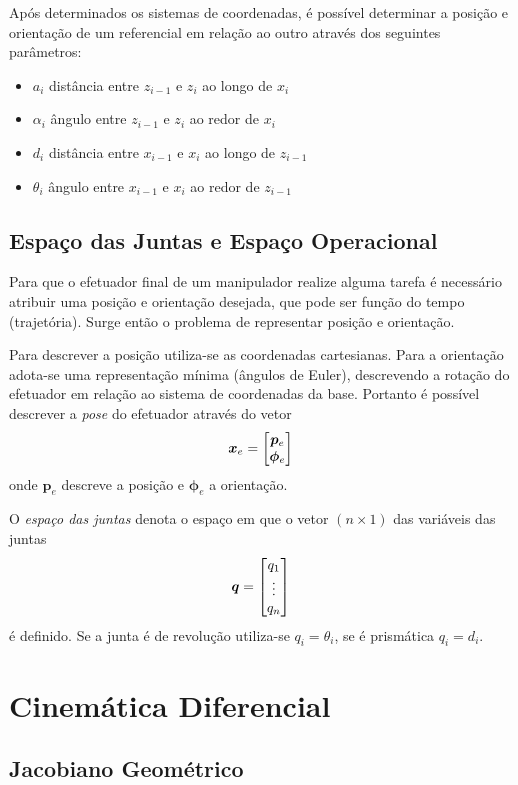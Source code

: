 Após determinados os sistemas de coordenadas, é possível determinar a posição e orientação de um referencial em relação ao outro através dos seguintes parâmetros:
\begin{itemize}
\item $a_i$ distância entre $z_{i-1}$ e $z_i$ ao longo de $x_i$
\item $\alpha_i$ ângulo entre $z_{i-1}$ e $z_i$ ao redor de $x_i$
\item $d_i$ distância entre $x_{i-1}$ e $x_i$ ao longo de $z_{i-1}$
\item $\theta_i$ ângulo entre $x_{i-1}$ e $x_i$ ao redor de $z_{i-1}$
\end{itemize}
\subsection{Espaço das Juntas e Espaço Operacional}
Para que o efetuador final de um manipulador realize alguma tarefa é necessário atribuir uma posição e orientação desejada, que  pode ser função do tempo (trajetória). Surge então o problema de representar posição e orientação. 

Para descrever a posição utiliza-se as coordenadas cartesianas. Para a orientação adota-se uma representação mínima (ângulos de Euler), descrevendo a rotação do efetuador em relação ao sistema de coordenadas da base. Portanto é possível descrever a \textit{pose} do efetuador através do vetor
\begin{equation} \label{eq:op_space}
\bm{x}_e = \begin{bmatrix} \bm{p}_e \\ \bm{\phi}_e\end{bmatrix}
\end{equation}
onde $\bm{p}_e$ descreve a posição e $\bm{\phi}_e$ a orientação.

O \textit{espaço das juntas} denota o espaço em que o vetor $(n \times 1)$ das variáveis das juntas
\begin{equation} \label{eq:joint_space}
\bm{q} = \begin{bmatrix}q_1 \\ \vdots \\ q_n\end{bmatrix}
\end{equation} 
é definido. Se a junta é de revolução utiliza-se $q_i = \theta_i$, se é prismática $q_i = d_i$.

\section{Cinemática Diferencial}
\subsection{Jacobiano Geométrico}

